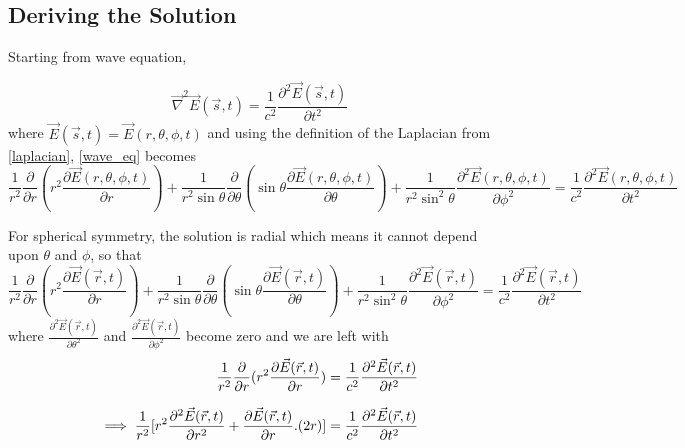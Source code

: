 \subsection{Deriving the Solution}

Starting from wave equation,

   \begin{equation}\label{wave_eq}
   \vec{\nabla}^2\vec{E}(\vec{s},t) =  \frac{1}{c^2}\frac{\partial^2\vec{E}(\vec{s},t)}{\partial t^2}
   \end{equation}
%
where
%
$\vec{E}(\vec{s},t) = \vec{E}(r,\theta,\phi,t)$
and using the definition of the Laplacian from \eqref{laplacian}, \eqref{wave_eq} becomes
%
   \begin{equation}
   \frac{1}{r^2}\frac{\partial}{\partial r}(r^2\frac{\partial\vec{E}(r,\theta,\phi,t) }{\partial r})+\frac{1}{r^2\sin\theta}\frac{\partial}{\partial\theta}(\sin\theta\frac{\partial \vec{E}(r,\theta,\phi,t)}{\partial \theta})+\frac{1}{r^2\sin^2\theta}\frac{\partial^2\vec{E}(r,\theta,\phi,t)}{\partial \phi^2} = \frac{1}{c^2}\frac{\partial^2\vec{E}(r,\theta,\phi,t)}{\partial t^2}
   \end{equation}

   For spherical symmetry, the solution is radial which means it cannot depend upon $\theta$ and $\phi$, so that
%
   \begin{equation}
   \frac{1}{r^2}\frac{\partial}{\partial r}(r^2\frac{\partial\vec{E}(\vec{r},t) }{\partial r})+\frac{1}{r^2\sin\theta}\frac{\partial}{\partial\theta}(\sin\theta\frac{\partial \vec{E}(\vec{r},t)}{\partial \theta})+\frac{1}{r^2\sin^2\theta}\frac{\partial^2\vec{E}(\vec{r},t)}{\partial \phi^2} = \frac{1}{c^2}\frac{\partial^2\vec{E}(\vec{r},t)}{\partial t^2}
   \end{equation}
%
where $\displaystyle \frac{\partial^2\vec{E}(\vec{r},t)}{\partial \theta^2}$ and $\displaystyle \frac{\partial^2\vec{E}(\vec{r},t)}{\partial \phi^2}$ become zero and we are left with
%
   \begin{equation}\label{wave_eqn_1}
   \begin{aligned}
      \frac{1}{r^2}\frac{\partial}{\partial r}(r^2\frac{\partial\vec{E}(\vec{r},t) }{\partial r}) = \frac{1}{c^2}\frac{\partial^2\vec{E}(\vec{r},t)}{\partial t^2}\\[0.5\baselineskip]
      \implies \frac{1}{r^2}[r^2\frac{\partial^2\vec{E}(\vec{r},t)}{\partial r^2}+\frac{\partial\vec{E}(\vec{r},t) }{\partial r}.(2r)] = \frac{1}{c^2}\frac{\partial^2\vec{E}(\vec{r},t)}{\partial t^2}
   \end{aligned}
   \end{equation}


